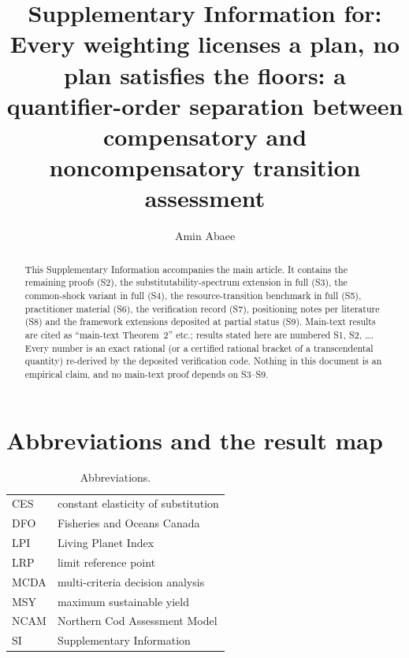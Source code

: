 \documentclass[preprint,11pt,authoryear]{elsarticle}
\theoremstyle{remark}
\begin{document}
\begin{frontmatter}
\title{Supplementary Information for:\\ Every weighting licenses a plan, no plan satisfies the floors: a quantifier-order separation between compensatory and noncompensatory transition assessment}
\author[1]{Amin Abaee}
\begin{abstract}
This Supplementary Information accompanies the main article. It contains the remaining proofs (S2), the substitutability-spectrum extension in full (S3), the common-shock variant in full (S4), the resource-transition benchmark in full (S5), practitioner material (S6), the verification record (S7), positioning notes per literature (S8) and the framework extensions deposited at partial status (S9). Main-text results are cited as ``main-text Theorem~2'' etc.; results stated here are numbered S1, S2, \dots. Every number is an exact rational (or a certified rational bracket of a transcendental quantity) re-derived by the deposited verification code. Nothing in this document is an empirical claim, and no main-text proof depends on S3--S9.
\end{abstract}
\end{frontmatter}

\section{Abbreviations and the result map}

\begin{table}[!htbp]
\centering\small
\caption{Abbreviations.}
\begin{tabular}{@{}ll@{}}
\toprule
CES & constant elasticity of substitution \\
DFO & Fisheries and Oceans Canada \\
LPI & Living Planet Index \\
LRP & limit reference point \\
MCDA & multi-criteria decision analysis \\
MSY & maximum sustainable yield \\
NCAM & Northern Cod Assessment Model \\
SI & Supplementary Information \\
\bottomrule
\end{tabular}
\end{table}
\end{document}
